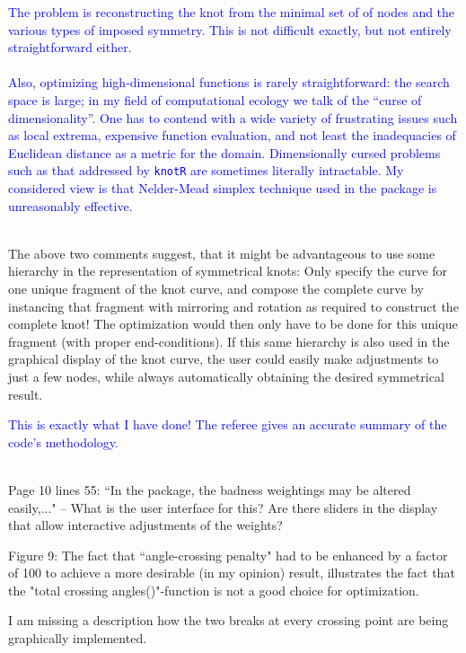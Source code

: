 \documentclass[12pt]{article}
\begin{document}
\textcolor{blue}{The problem is reconstructing the knot from the
  minimal set of of nodes and the various types of imposed symmetry.
  This is not difficult exactly, but not entirely straightforward
  either.\\ \\ Also, optimizing high-dimensional functions is rarely
  straightforward: the search space is large; in my field of
  computational ecology we talk of the ``curse of dimensionality''.
  One has to contend with a wide variety of frustrating issues such as
  local extrema, expensive function evaluation, and not least the
  inadequacies of Euclidean distance as a metric for the domain.
  Dimensionally cursed problems such as that addressed by {\tt knotR}
  are sometimes literally intractable.  My considered view is that
  Nelder-Mead simplex technique used in the package is unreasonably
  effective.\\ \\ }

{The above two comments suggest, that it might be advantageous to use
  some hierarchy in the representation of symmetrical knots: Only
  specify the curve for one unique fragment of the knot curve, and
  compose the complete curve by instancing that fragment with
  mirroring and rotation as required to construct the complete knot!
  The optimization would then only have to be done for this unique
  fragment (with proper end-conditions).  If this same hierarchy is
  also used in the graphical display of the knot curve, the user could
  easily make adjustments to just a few nodes, while always
  automatically obtaining the desired symmetrical result.}

\textcolor{blue}{This is exactly what I have done!  The referee gives
  an accurate summary of the code's methodology.\\ \\}

Page 10 lines 55: ``In the package, the badness weightings may be
altered easily,..."  -- What is the user interface for this?  Are
there sliders in the display that allow interactive adjustments of the
weights?

Figure 9: The fact that ``angle-crossing penalty" had to be enhanced by
a factor of 100 to achieve a more desirable (in my opinion) result,
illustrates the fact that the "total crossing angles()"-function is
not a good choice for optimization.

I am missing a description how the two breaks at every crossing point
are being graphically implemented.
\end{document}
